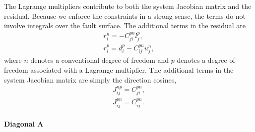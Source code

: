 The Lagrange multipliers contribute to both the system Jacobian matrix
and the residual. Because we enforce the constraints in a strong sense,
the terms do not involve integrals over the fault surface. The additional
terms in the residual are
\begin{gather}
r_{i}^{n}=-C_{ji}^{pn}l_{j}^{p},\\
r_{i}^{p}=d_{i}^{p}-C_{ij}^{pn}u_{j}^{n},
\end{gather}
where $n$ denotes a conventional degree of freedom and $p$ denotes
a degree of freedom associated with a Lagrange multiplier. The additional
terms in the system Jacobian matrix are simply the direction cosines,
\begin{gather}
J_{ij}^{np}=C_{ji}^{pn},\\
J_{ij}^{pn}=C_{ij}^{pn}.
\end{gather}



\paragraph{Diagonal A}

